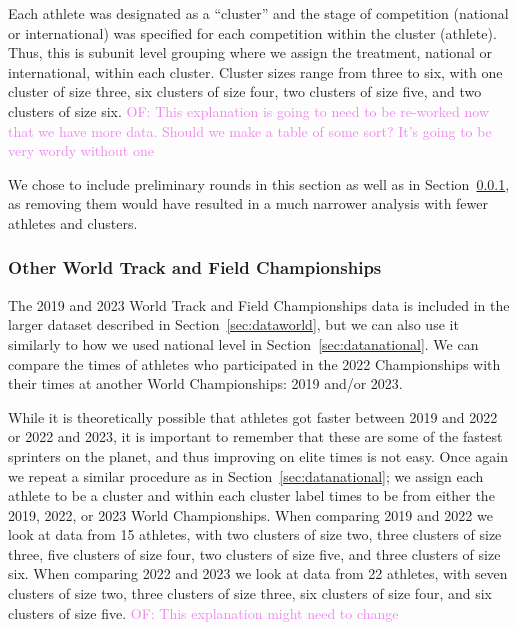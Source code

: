 \documentclass[12pt, letterpaper]{article}
\newcommand{\of}[1]{\textcolor{violet}{OF: #1}}
\begin{document}
Each athlete was designated as a ``cluster'' and the stage of competition (national
or international) was specified for each competition within the cluster (athlete).
Thus, this is subunit level grouping where we assign the treatment, national or
international, within each cluster. Cluster sizes range from three to six, with
one cluster of size three, six clusters of size four, two clusters of size five,
and two clusters of size six.
\of{This explanation is going to need to be re-worked now that we have more data.
Should we make a table of some sort? It's going to be very wordy without one}

We chose to include preliminary rounds in this section as well as in
Section~\ref{sec:data2019}, as removing them would have resulted in a much
narrower analysis with fewer athletes and clusters.


\subsubsection{Other World Track and Field Championships}\label{sec:data2019}
The 2019 and 2023 World Track and Field Championships data is included in the 
larger dataset described in Section~\ref{sec:dataworld}, but we can also use it
similarly to how we used national level in Section~\ref{sec:datanational}. We
can compare the times of athletes who participated in the 2022 Championships with
their times at another World Championships: 2019 and/or 2023.


While it is theoretically possible that athletes got faster 
between 2019 and 2022 or 2022 and 2023, it is important to 
remember that these are some of the fastest sprinters on the planet, and thus
improving on elite times is not easy. Once again we repeat a similar procedure
as in Section~\ref{sec:datanational}; we assign each athlete to be a cluster and
within each cluster label times to be from either the 2019, 2022, or 2023 World
Championships. When comparing 2019 and 2022 we look at data from 15
athletes, with two clusters of size two, three clusters of size three, five 
clusters of size four, two clusters of size five, and three clusters of size six.
When comparing 2022 and 2023 we look at data from 22 athletes, with seven 
clusters of size two, three clusters of size three, six clusters of size four,
and six clusters of size five.
\of{This explanation might need to change}
\end{document}
